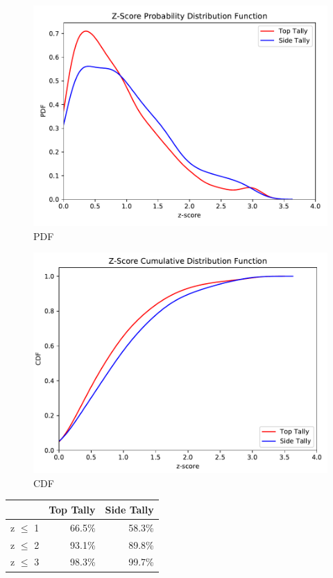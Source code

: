 \begin{figure}[!h]
    \centering
    \includegraphics[scale=0.6, trim={0cm 0cm 0cm 0cm}, clip]{figs/dose_pdf.pdf}
    \caption{PDF}
    \label{fig:dose_pdf}
\end{figure}
\begin{figure}[!h]
    \centering
    \includegraphics[scale=0.6, trim={0cm 0cm 0cm 0cm}, clip]{figs/dose_cdf.pdf}
    \caption{CDF}
    \label{fig:dose_cdf}
\end{figure}

\begin{table}[]
    \centering
    \begin{tabular}{|r|r|r|}
    \hline
               & Top Tally & Side Tally \\ \hline
    z $\leq$ 1 & 66.5\%    & 58.3\%     \\ \hline
    z $\leq$ 2 & 93.1\%    & 89.8\%     \\ \hline
    z $\leq$ 3 & 98.3\%    & 99.7\%     \\ \hline
    \end{tabular}
\end{table}